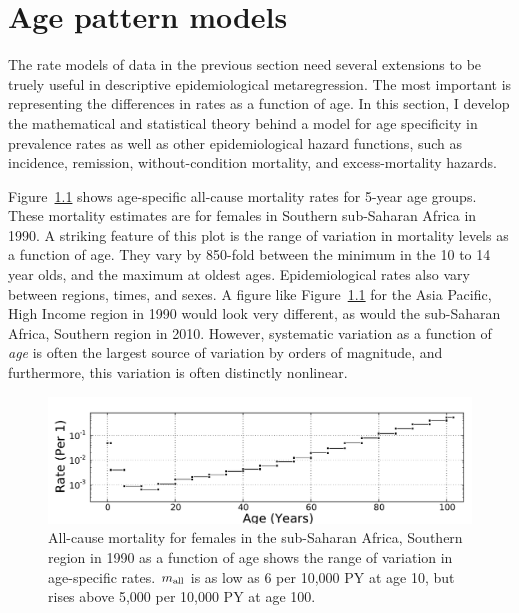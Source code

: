 \chapter{Age pattern models}
\label{theory-age_pattern_model}
The rate models of data in the previous section need several
extensions to be truely useful in descriptive epidemiological
metaregression.  The most important is representing the differences in
rates as a function of age.  In this section, I develop the
mathematical and statistical theory behind a model for age specificity
in prevalence rates as well as other epidemiological hazard functions,
such as incidence, remission, without-condition mortality, and
excess-mortality hazards.

Figure~\ref{ssas-mx_female_1990} shows age-specific all-cause
mortality rates for 5-year age groups.  These mortality estimates are
for females in Southern sub-Saharan Africa in 1990.  A striking
feature of this plot is the range of variation in mortality levels as
a function of age.  They vary by 850-fold between the minimum
in the 10 to 14 year olds, and the maximum at oldest
ages. Epidemiological rates also vary between regions, times, and
sexes.  A figure like Figure~\ref{ssas-mx_female_1990} for the Asia
Pacific, High Income region in 1990 would look very different, as
would the sub-Saharan Africa, Southern region in 2010. However,
systematic variation as a function of \emph{age} is often the largest
source of variation by orders of magnitude, and furthermore, this
variation is often distinctly nonlinear.

\begin{figure}[h]
\begin{center}
\includegraphics[width=\textwidth]{ssas-mx_female_1990.pdf}
\caption{All-cause mortality for females in the sub-Saharan Africa,
  Southern region in 1990 as a function of age shows the range of
  variation in age-specific rates.  $m_{\text{all}}$ is as low as 6 per
  10,000 PY at age 10, but rises above 5,000 per 10,000 PY at age 100.}
\label{ssas-mx_female_1990}
\end{center}
\end{figure}

